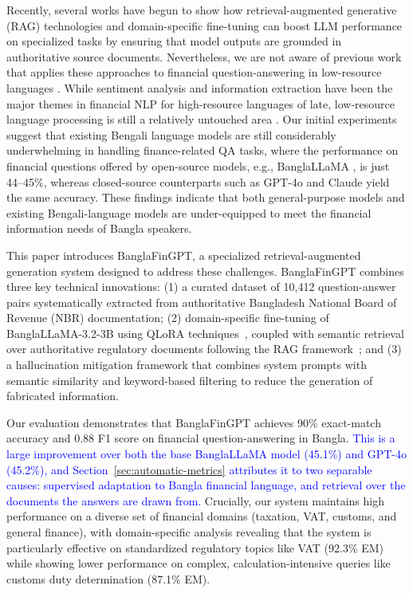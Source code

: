 \documentclass{article}
\newcommand{\revised}[1]{\textcolor{blue}{#1}}
\newcommand{\revised}[1]{#1}
\begin{document}
Recently, several works have begun to show how retrieval-augmented generative (RAG)
\cite{Lewis2020} technologies and domain-specific fine-tuning \cite{Houlsby2019} can
boost LLM performance on specialized tasks by ensuring that model outputs are grounded
in authoritative source documents. Nevertheless, we are not aware of previous work that
applies these approaches to financial question-answering in low-resource languages
\cite{xing2020}. While sentiment analysis and information extraction have been the
major themes in financial NLP for high-resource languages of late, low-resource
language processing is still a relatively untouched area \cite{Pakray2025}. Our initial
experiments suggest that existing Bengali language models are still considerably
underwhelming in handling finance-related QA tasks, where the performance on financial
questions offered by open-source models, e.g., BanglaLLaMA \cite{zehady2025}, is just
44--45\%, whereas closed-source counterparts such as GPT-4o and Claude yield the same
accuracy. These findings indicate that both general-purpose models and existing
Bengali-language models are under-equipped to meet the financial information needs of
Bangla speakers.

This paper introduces BanglaFinGPT, a specialized retrieval-augmented generation system
designed to address these challenges. BanglaFinGPT combines three key technical
innovations: (1) a curated dataset of 10,412 question-answer pairs systematically
extracted from authoritative Bangladesh National Board of Revenue (NBR) documentation;
(2) domain-specific fine-tuning of BanglaLLaMA-3.2-3B using QLoRA
techniques~\cite{Dettmers2023}, coupled with semantic retrieval over authoritative
regulatory documents following the RAG framework~\cite{Lewis2020}; and (3) a
hallucination mitigation framework that combines system prompts with semantic
similarity and keyword-based filtering to reduce the generation of fabricated
information.

Our evaluation demonstrates that BanglaFinGPT achieves 90\% exact-match accuracy and
0.88 F1 score on financial question-answering in Bangla. \revised{This is a large
improvement over both the base BanglaLLaMA model (45.1\%) and GPT-4o (45.2\%), and
Section~\ref{sec:automatic-metrics} attributes it to two separable causes: supervised
adaptation to Bangla financial language, and retrieval over the documents the answers
are drawn from.} Crucially, our system maintains high performance on a diverse set of
financial domains (taxation, VAT, customs, and general finance), with domain-specific
analysis revealing that the system is particularly effective on standardized regulatory
topics like VAT (92.3\% EM) while showing lower performance on complex,
calculation-intensive queries like customs duty determination (87.1\% EM).
\end{document}
